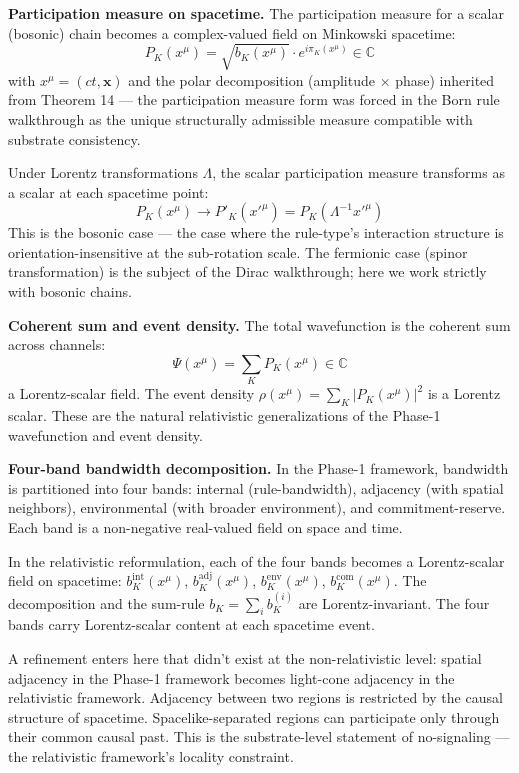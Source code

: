 \documentclass[11pt,a4paper]{article}
\begin{document}
\textbf{Participation measure on spacetime.} The participation measure for a scalar (bosonic) chain becomes a complex-valued field on Minkowski spacetime:
\[
P_K(x^\mu) = \sqrt{b_K(x^\mu)} \cdot e^{i\pi_K(x^\mu)} \in \mathbb{C}
\]
with $x^\mu = (ct, \mathbf{x})$ and the polar decomposition (amplitude $\times$ phase) inherited from Theorem 14 --- the participation measure form was forced in the Born rule walkthrough as the unique structurally admissible measure compatible with substrate consistency.

Under Lorentz transformations $\Lambda$, the scalar participation measure transforms as a scalar at each spacetime point:
\[
P_K(x^\mu) \to P'_K(x'^\mu) = P_K(\Lambda^{-1}x'^\mu)
\]
This is the bosonic case --- the case where the rule-type's interaction structure is orientation-insensitive at the sub-rotation scale. The fermionic case (spinor transformation) is the subject of the Dirac walkthrough; here we work strictly with bosonic chains.

\textbf{Coherent sum and event density.} The total wavefunction is the coherent sum across channels:
\[
\Psi(x^\mu) = \sum_K P_K(x^\mu) \in \mathbb{C}
\]
a Lorentz-scalar field. The event density $\rho(x^\mu) = \sum_K |P_K(x^\mu)|^2$ is a Lorentz scalar. These are the natural relativistic generalizations of the Phase-1 wavefunction and event density.

\textbf{Four-band bandwidth decomposition.} In the Phase-1 framework, bandwidth is partitioned into four bands: internal (rule-bandwidth), adjacency (with spatial neighbors), environmental (with broader environment), and commitment-reserve. Each band is a non-negative real-valued field on space and time.

In the relativistic reformulation, each of the four bands becomes a Lorentz-scalar field on spacetime: $b_K^{\mathrm{int}}(x^\mu)$, $b_K^{\mathrm{adj}}(x^\mu)$, $b_K^{\mathrm{env}}(x^\mu)$, $b_K^{\mathrm{com}}(x^\mu)$. The decomposition and the sum-rule $b_K = \sum_i b_K^{(i)}$ are Lorentz-invariant. The four bands carry Lorentz-scalar content at each spacetime event.

A refinement enters here that didn't exist at the non-relativistic level: spatial adjacency in the Phase-1 framework becomes light-cone adjacency in the relativistic framework. Adjacency between two regions is restricted by the causal structure of spacetime. Spacelike-separated regions can participate only through their common causal past. This is the substrate-level statement of no-signaling --- the relativistic framework's locality constraint.
\end{document}
